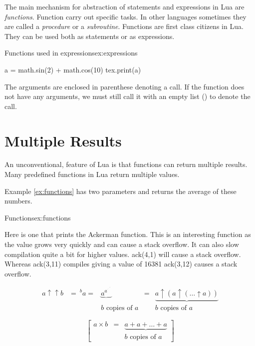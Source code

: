 The main mechanism for abstraction of statements and expressions in Lua are \textit{functions}. Function carry out specific tasks. In other languages sometimes they are called a \textit{procedure} or a \textit{subroutine}. Functions are first class citizens in Lua. They can be used both as statements or as expressions.

\begin{texexample}{Functions used in expressions}{ex:expressions}
\begin{luacode}
a = math.sin(2) + math.cos(10)
tex.print(a)
\end{luacode}
\end{texexample}

The arguments are enclosed in parenthese denoting a call. If the function does not have any arguments, we must still call it with an empty list () to denote the call.

\section{Multiple Results}

An unconventional, feature of Lua is that functions can return multiple results. Many predefined functions in Lua return multiple values. 

Example \ref{ex:functions} has two parameters and returns the average of these numbers.

\begin{texexample}{Functions}{ex:functions}
\end{texexample}

Here is one that prints the Ackerman function. This is an interesting function as the value grows very quickly and can cause a stack overflow. It can also slow compilation quite a bit for higher values. ack(4,1) will cause a stack overflow. Whereas ack(3,11) compiles giving a value of 16381 ack(3,12) causes a stack overflow.  

\[
\begin{matrix}
   a\uparrow\uparrow b & = {\ ^{b}a}  = & \underbrace{a^{a^{{}^{.\,^{.\,^{.\,^a}}}}}} & 
   = & \underbrace{a\uparrow (a\uparrow(\dots\uparrow a))} 
\\  
    & & b\mbox{ copies of }a
    & & b\mbox{ copies of }a
  \end{matrix}
\]

\[
\begin{bmatrix}
   a\times b & = & \underbrace{a+a+\dots+a} \\
   & & b\mbox{ copies of }a
\end{bmatrix} 
\]


